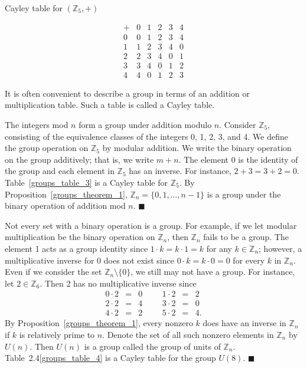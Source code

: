 \begin{table}[htb]\label{groups_table_3}
\caption{Cayley table for $({\mathbb Z}_5, +)$}{\small
$$
\begin{array}{c|ccccc}
+ & 0 & 1 & 2 & 3 & 4 \\
\hline
0 & 0 & 1 & 2 & 3 & 4 \\
1 & 1 & 2 & 3 & 4 & 0 \\
2 & 2 & 3 & 4 & 0 & 1 \\
3 & 3 & 4 & 0 & 1 & 2 \\
4 & 4 & 0 & 1 & 2 & 3
\end{array}
$$
}
\end{table}
 
It is often convenient to describe a group in terms of an addition or multiplication table.  Such a table is called a {\bfi Cayley table}.

\medskip
 
The integers mod $n$ form a group under addition modulo $n$.  Consider ${\mathbb Z}_5$, consisting of the equivalence classes of the integers 0, 1, 2, 3, and 4.  We define the group operation on ${\mathbb Z}_5$ by modular addition.  We write the binary operation on the group additively; that is, we write $m + n$.  The element 0 is the identity of the group and each element in ${\mathbb Z}_5$ has an inverse. For instance, $2 + 3 = 3 + 2 = 0$.  Table~\ref{groups_table_3} is a Cayley table for ${\mathbb Z}_5$.  By Proposition~\ref{groups_theorem_1}, ${\mathbb Z}_n = \{0, 1, \ldots, n-1 \}$ is a group under the binary operation of addition mod $n$.  
\hspace{\fill} $\blacksquare$

\medskip

Not every set with a binary operation is a group.  For example, if we let modular multiplication be the binary operation on ${\mathbb Z}_n$, then ${\mathbb Z}_n$ fails to be a group.  The element 1 acts as a group identity since $1 \cdot k = k \cdot 1 = k$ for any $k \in {\mathbb Z}_n$; however, a multiplicative inverse for $0$ does not exist since $0 \cdot k = k \cdot 0 = 0$ for every $k$ in ${\mathbb Z}_n$.  Even if we consider the set ${\mathbb Z}_n \setminus \{0 \}$, we still may not have a group.  For instance, let $2 \in {\mathbb Z}_6$. Then 2 has no multiplicative inverse since 
$$
\begin{array}{rclccrcl}
0 \cdot 2 & = & 0 & & & 1 \cdot 2 & = & 2 \\
2 \cdot 2 & = & 4 & & & 3 \cdot 2 & = & 0 \\
4 \cdot 2 & = & 2 & & & 5 \cdot 2 & = & 4.
\end{array}
$$
By Proposition~\ref{groups_theorem_1}, every nonzero $k$ does have an inverse in ${\mathbb Z}_n$ if $k$ is relatively prime to $n$.  Denote the set of all such nonzero elements in ${\mathbb Z}_n$ by $U(n)$\label{groupofunits}.  Then $U(n)$ is a group called the {\bfi group of units\/} of ${\mathbb Z}_n$.  Table~2.4\ref{groups_table_4} is a Cayley table for the group $U(8)$. 
\hspace{\fill} $\blacksquare$

